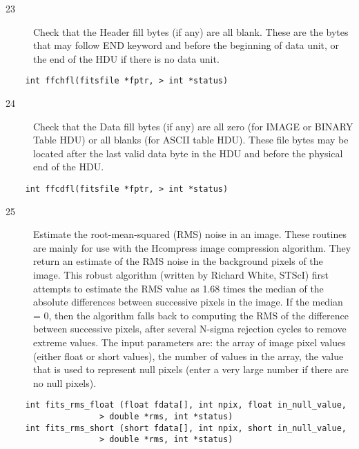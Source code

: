 \documentclass[11pt]{book}
\begin{document}
\begin{description}
\item[23]  Check that the Header fill bytes (if any) are all blank.  These are the bytes
     that may follow END keyword and before the beginning of data unit,
     or the end of the HDU if there is no data unit.
   \label{ffchfl}
\end{description}

\begin{verbatim}
    int ffchfl(fitsfile *fptr, > int *status)
\end{verbatim}

\begin{description}
\item[24]  Check that the Data fill bytes (if any) are all zero (for IMAGE or
     BINARY Table HDU) or all blanks (for ASCII table HDU).  These file
     bytes may be located after the last valid data byte in the HDU and
     before the physical end of the HDU.
     \label{ffcdfl}
\end{description}

\begin{verbatim}
    int ffcdfl(fitsfile *fptr, > int *status)
\end{verbatim}

\begin{description}
\item[25]  Estimate the root-mean-squared (RMS) noise in an image.
These routines are mainly for use with the Hcompress image compression
algorithm.  They return an estimate of the RMS noise in the background
pixels of the image.  This robust algorithm (written by Richard
White, STScI) first attempts to estimate the RMS value
as 1.68 times the median of the absolute differences between successive
pixels in the image.  If the median = 0,  then the
algorithm falls back to computing the RMS of the difference between successive
pixels, after several N-sigma rejection cycles to remove
extreme values.  The input parameters are:  the array of image pixel values
(either float or short values), the number of values in the array,
the value that is used to represent null pixels (enter a very
large number if there are no null pixels). \label{imageRMS}
\end{description}

\begin{verbatim}
    int fits_rms_float (float fdata[], int npix, float in_null_value,
                   > double *rms, int *status)
    int fits_rms_short (short fdata[], int npix, short in_null_value,
                   > double *rms, int *status)
\end{verbatim}
\end{document}
